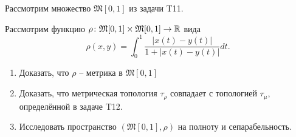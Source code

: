 \begin{task}[T15]
    Рассмотрим множество $\mathfrak{M}[0, 1]$ из задачи T11.

    Рассмотрим функцию $\rho\colon \mathfrak{M}[0, 1] \times \mathfrak{M}[0, 1] \to \mathbb{R}$ вида
    \[
        \rho(x, y) = \int_0^1 \dfrac{|x(t) - y(t)|}{1 + |x(t) - y(t)|}dt.
    \]
    \begin{enumerate}
        \item Доказать, что $\rho$ -- метрика в $\mathfrak{M}[0, 1]$
        \item Доказать, что метрическая топология $\tau_\rho$ совпадает с топологией $\tau_\mu$, определённой в задаче T12.
        \item Исследовать пространство $(\mathfrak{M}[0, 1], \rho)$ на полноту и сепарабельность.
    \end{enumerate}
\end{task}

